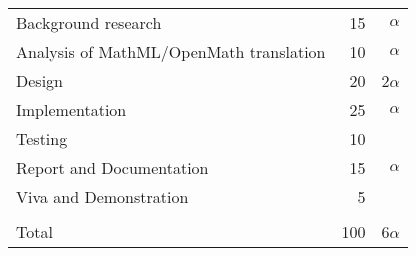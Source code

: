 %
%
%
%
\begin{center}\begin{tabular}{lrr}
  Background research           	  &	 15 &	 $\alpha$	\\
  Analysis of MathML/OpenMath translation &      10 &    $\alpha$        \\ 
  Design				  &	 20 &	2$\alpha$	\\
  Implementation	        	  &	 25 &	 $\alpha$	\\
  Testing       			  &	 10 &			\\
  Report and Documentation		  &	 15 &	 $\alpha$	\\
  Viva and Demonstration		  &	  5 &			\\ \cline{2-3}
								\\
  Total					  &	100 &	6$\alpha$	\\
\end{tabular}\end{center}




